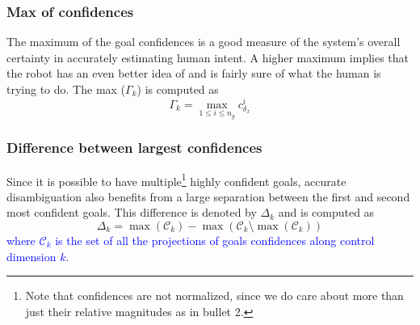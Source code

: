 \documentclass[conference]{IEEEtran}
\newcommand{\argmax}{\arg\!\max}
\begin{document}
\subsubsection{Max of confidences}
The maximum of the goal confidences is a good measure of the system's overall certainty in accurately estimating human intent. A higher maximum implies that the robot has an even better idea of and is fairly sure of what the human is trying to do. The max ($\Gamma_{k}$) is computed as
\begin{equation*}
\Gamma_{k} =\max\limits_{1 \leq i \leq n_g}c^{i}_{\delta_x}
\end{equation*}
\subsubsection{Difference between largest confidences}
%
Since it is possible to have multiple\footnote{Note that confidences are not normalized, since we do care about more than just their relative magnitudes as in bullet 2.} highly confident goals, accurate disambiguation also benefits from a large separation between the first and second most confident goals. 
This difference is denoted by $\Delta_{k}$ and is computed as
\begin{equation*}
\Delta_{k} = \max(\mathcal{C}_k) - \max(\mathcal{C}_k \setminus {\max(\mathcal{C}_k)})
\end{equation*}
\textcolor{blue}{where $\mathcal{C}_k$ is the set of all the projections of goals confidences along control dimension $k$}.
\end{document}
